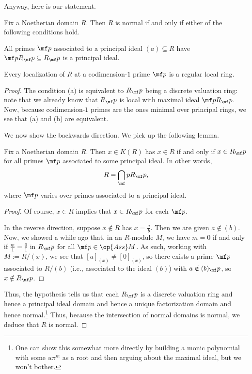 Anyway, here is our statement.
\begin{theorem}
	Fix a Noetherian domain $R$. Then $R$ is normal if and only if either of the following conditions hold.
	\begin{listalph}
		\item All primes $\mf p$ associated to a principal ideal $(a)\subseteq R$ have $\mf pR_\mf p\subseteq R_\mf p$ is a principal ideal.
		\item Every localization of $R$ at a codimension-$1$ prime $\mf p$ is a regular local ring.
	\end{listalph}
\end{theorem}
\begin{proof}
	The condition (a) is equivalent to $R_\mf p$ being a discrete valuation ring: note that we already know that $R_\mf p$ is local with maximal ideal $\mf pR_\mf p$. Now, because codimension-$1$ primes are the ones minimal over principal rings, we see that (a) and (b) are equivalent.

	We now show the backwards direction. We pick up the following lemma.
	\begin{lemma}
		Fix a Noetherian domain $R$. Then $x\in K(R)$ has $x\in R$ if and only if $x\in R_\mf p$ for all primes $\mf p$ associated to some principal ideal. In other words,
		\[R=\bigcap_\mf pR_\mf p,\]
		where $\mf p$ varies over primes associated to a principal ideal.
	\end{lemma}
	\begin{proof}
		Of course, $x\in R$ implies that $x\in R_\mf p$ for each $\mf p$.

		In the reverse direction, suppose $x\notin R$ has $x=\frac ab$. Then we are given $a\notin(b)$. Now, we showed a while ago that, in an $R$-module $M$, we have $m=0$ if and only if $\frac m1=\frac01$ in $R_\mf p$ for all $\mf p\in\op{Ass}M$. As such, working with $M:=R/(x)$, we see that $[a]_{(x)}\ne[0]_{(x)}$, so there exists a prime $\mf p$ associated to $R/(b)$ (i.e., associated to the ideal $(b)$) with $a\notin(b)_\mf p$, so $x\notin R_\mf p$.
	\end{proof}
	Thus, the hypothesis tells us that each $R_\mf p$ is a discrete valuation ring and hence a principal ideal domain and hence a unique factorization domain and hence normal.\footnote{One can show this somewhat more directly by building a monic polynomial with some $u\pi^m$ as a root and then arguing about the maximal ideal, but we won't bother.} Thus, because the intersection of normal domains is normal, we deduce that $R$ is normal.


\end{proof}
